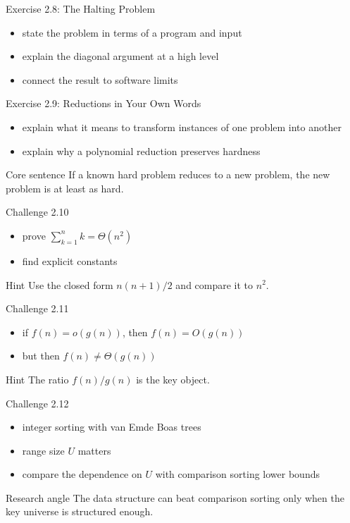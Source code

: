 \documentclass[aspectratio=169,xcolor=dvipsnames]{beamer}
\begin{document}
\begin{frame}{Exercise 2.8: The Halting Problem}
  \begin{itemize}
    \item state the problem in terms of a program and input
    \item explain the diagonal argument at a high level
    \item connect the result to software limits
  \end{itemize}
\end{frame}

\begin{frame}{Exercise 2.9: Reductions in Your Own Words}
  \begin{itemize}
    \item explain what it means to transform instances of one problem into another
    \item explain why a polynomial reduction preserves hardness
  \end{itemize}
  \begin{block}{Core sentence}
    If a known hard problem reduces to a new problem, the new problem is at least as hard.
  \end{block}
\end{frame}

\begin{frame}{Challenge 2.10}
  \begin{itemize}
    \item prove $\sum_{k=1}^{n} k = \Theta(n^2)$
    \item find explicit constants
  \end{itemize}
  \begin{exampleblock}{Hint}
    Use the closed form $n(n+1)/2$ and compare it to $n^2$.
  \end{exampleblock}
\end{frame}

\begin{frame}{Challenge 2.11}
  \begin{itemize}
    \item if $f(n)=o(g(n))$, then $f(n)=O(g(n))$
    \item but then $f(n)\neq \Theta(g(n))$
  \end{itemize}
  \begin{block}{Hint}
    The ratio $f(n)/g(n)$ is the key object.
  \end{block}
\end{frame}

\begin{frame}{Challenge 2.12}
  \begin{itemize}
    \item integer sorting with van Emde Boas trees
    \item range size $U$ matters
    \item compare the dependence on $U$ with comparison sorting lower bounds
  \end{itemize}
  \begin{alertblock}{Research angle}
    The data structure can beat comparison sorting only when the key universe is structured enough.
  \end{alertblock}
\end{frame}
\end{document}
